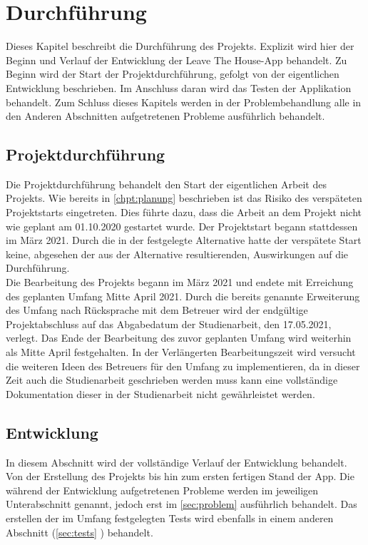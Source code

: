 \chapter{Durchführung}\label{chpt:durchfuerung}

Dieses Kapitel beschreibt die Durchführung des Projekts. Explizit wird hier der Beginn und Verlauf der Entwicklung der \glqq Leave The House\grqq-App behandelt. Zu Beginn wird der Start der Projektdurchführung, gefolgt von der eigentlichen Entwicklung beschrieben. Im Anschluss daran wird das Testen der Applikation behandelt. Zum Schluss dieses Kapitels werden in der Problembehandlung alle in den Anderen Abschnitten aufgetretenen Probleme ausführlich behandelt.

\section{Projektdurchführung}\label{sec:projektdurchfuerung}

Die Projektdurchführung behandelt den Start der eigentlichen Arbeit des Projekts. Wie bereits in \autoref{chpt:planung} beschrieben ist das Risiko des verspäteten Projektstarts eingetreten. Dies führte dazu, dass die Arbeit an dem Projekt nicht wie geplant am 01.10.2020 gestartet wurde. Der Projektstart begann stattdessen im März 2021. Durch die in der  festgelegte Alternative hatte der verspätete Start keine, abgesehen der aus der Alternative resultierenden, Auswirkungen auf die Durchführung.\\
Die Bearbeitung des Projekts begann im März 2021 und endete mit Erreichung des geplanten Umfang Mitte April 2021. Durch die bereits genannte Erweiterung des Umfang nach Rücksprache mit dem Betreuer wird der endgültige Projektabschluss auf das Abgabedatum der Studienarbeit, den 17.05.2021, verlegt. Das Ende der Bearbeitung des zuvor geplanten Umfang wird weiterhin als Mitte April festgehalten. In der Verlängerten Bearbeitungszeit wird versucht die weiteren Ideen des Betreuers für den Umfang zu implementieren, da in dieser Zeit auch die Studienarbeit geschrieben werden muss kann eine vollständige Dokumentation dieser in der Studienarbeit nicht gewährleistet werden.

\section{Entwicklung}\label{sec:entwicklung}
In diesem Abschnitt wird der vollständige Verlauf der Entwicklung behandelt. Von der Erstellung des Projekts bis hin zum ersten fertigen Stand der App. Die während der Entwicklung aufgetretenen Probleme werden im jeweiligen Unterabschnitt genannt, jedoch erst im \autoref{sec:problem}  ausführlich behandelt. Das erstellen der im Umfang festgelegten Tests wird ebenfalls in einem anderen Abschnitt (\ref{sec:tests} ) behandelt.

